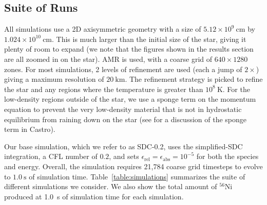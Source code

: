 \documentclass[preprint,linenumbers]{aastex631}
\newcommand{\isotm}[2]{{}^{#2}\mathrm{#1}}
\newcommand{\castro}{{\sf Castro}}
\begin{document}
\subsection{Suite of Runs}

All simulations use a 2D axisymmetric geometry
with a size of $5.12\times 10^9~\mathrm{cm}$ by $1.024\times
10^{10}~\mathrm{cm}$.  This is much larger than the initial size of
the star, giving it plenty of room to expand (we note that the figures
shown in the results section are all zoomed in on the star).  AMR is used, with a coarse grid of $640\times 1280$ zones.
For most simulations, 2 levels of
refinement are used (each a jump of $2\times$) giving a maximum resolution of
$20~\mathrm{km}$.  The refinement
strategy is picked to refine the star and any regions where the
temperature is greater than $10^8~\mathrm{K}$.  For the low-density regions outside of the
star, we use a sponge term on the momentum equation to prevent the
very low-density material that is not in hydrostatic equilibrium from
raining down on the star (see \citealt{eiden:2020} for a discussion of
the sponge term in \castro).


Our base simulation, which we refer to as SDC-0.2, uses the simplified-SDC integration, a CFL number
of $0.2$, and sets $\epsilon_\mathrm{rel} = \epsilon_\mathrm{abs} =
10^{-5}$ for both the species and energy.  Overall, the simulation
requires 21,784 coarse grid timesteps to evolve to $1.0~\mathrm{s}$ of
simulation time.  Table~\ref{table:simulations} summarizes the
suite of different simulations we consider.  We also show the
total amount of $\isotm{Ni}{56}$ produced at 1.0~s of simulation time for
each simulation.
\end{document}
